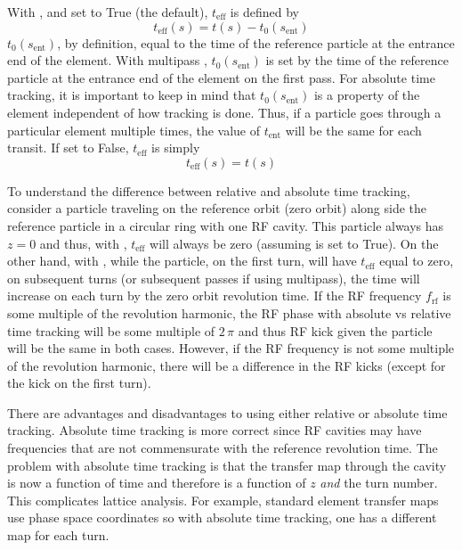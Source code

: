 With , and  set to True (the
default), $t_\text{eff}$ is defined by
\begin{equation}
  t_\text{eff}(s) = t(s) - t_0(s_\text{ent})
\end{equation}
$t_0(s_\text{ent})$, by definition, equal to the time of the reference particle at the entrance end
of the element. With multipass , $t_0(s_\text{ent})$ is set by the time of the
reference particle at the entrance end of the element on the first pass. For absolute time tracking,
it is important to keep in mind that $t_0(s_\text{ent})$ is a property of the element independent of
how tracking is done. Thus, if a particle goes through a particular element multiple times, the
value of $t_\text{ent}$ will be the same for each transit. If 
set to False, $t_\text{eff}$ is simply
\begin{equation}
  t_\text{eff}(s) = t(s) 
\end{equation}

To understand the difference between relative and absolute time tracking, consider a particle
traveling on the reference orbit (zero orbit) along side the reference particle in a circular ring
with one RF cavity. This particle always has $z = 0$ and thus, with ,
$t_\text{eff}$ will always be zero (assuming  is set to True).
On the other hand, with , while the particle, on the first turn, will have
$t_\text{eff}$ equal to zero, on subsequent turns (or subsequent passes if using
multipass), the time will increase on each turn by the zero orbit revolution time. If
the RF frequency $f_\text{rf}$ is some multiple of the revolution harmonic, the RF phase with
absolute vs relative time tracking will be some multiple of $2 \, \pi$ and thus RF kick given the
particle will be the same in both cases. However, if the RF frequency is not some multiple of the
revolution harmonic, there will be a difference in the RF kicks (except for the kick on the first
turn).

There are advantages and disadvantages to using either relative or absolute time tracking. Absolute
time tracking is more correct since RF cavities may have frequencies that are not commensurate with
the reference revolution time. The problem with absolute time tracking is that the transfer map
through the cavity is now a function of time and therefore is a function of $z$ {\em and} the turn
number. This complicates lattice analysis. For example, standard element transfer maps use phase space
coordinates so with absolute time tracking, one has a different map for each turn.

